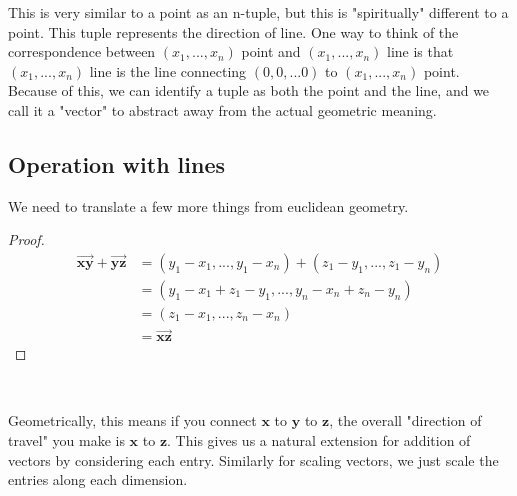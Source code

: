 This is very similar to a point as an n-tuple, but this is "spiritually" different to a point. This tuple represents the direction of line. One way to think of the correspondence between $(x_1,...,x_n)$ point and $(x_1,...,x_n)$ line is that $(x_1,...,x_n)$ line is the line connecting $(0,0,...0)$ to $(x_1,...,x_n)$ point. Because of this, we can identify a tuple as both the point and the line, and we call it a "vector" to abstract away from the actual geometric meaning.


\subsection{Operation with lines}
We need to translate a few more things from euclidean geometry.

\begin{proof}
	\begin{align*}
		\overrightarrow{\mathbf{xy}}+\overrightarrow{\mathbf{yz}}&=(y_1-x_1,..., y_1-x_n)+(z_1-y_1,..., z_1-y_n)\\
		&=(y_1-x_1+z_1-y_1, ... ,y_n-x_n+z_n-y_n)\\
		&= (z_1-x_1, ...,z_n-x_n)\\
		&= \overrightarrow{\mathbf{xz}}
	\end{align*}
\end{proof}
\

Geometrically, this means if you connect $\mathbf{x}$ to $\mathbf{y}$ to $\mathbf{z}$, the overall "direction of travel" you make is $\mathbf{x}$ to $\mathbf{z}$. This gives us a natural extension for addition of vectors by considering each entry. Similarly for scaling vectors, we just scale the entries along each dimension.

 \ \\

